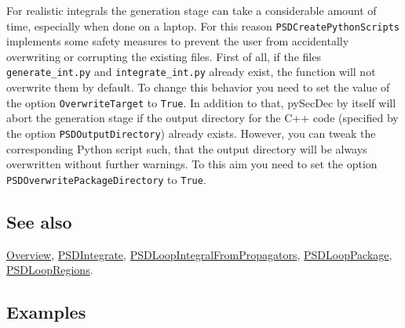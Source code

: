 \documentclass[../FeynHelpersManual.tex]{subfiles}
\begin{document}
For realistic integrals the generation stage can take a considerable
amount of time, especially when done on a laptop. For this reason
\texttt{PSDCreatePythonScripts} implements some safety measures to
prevent the user from accidentally overwriting or corrupting the
existing files. First of all, if the files \texttt{generate_int.py} and
\texttt{integrate_int.py} already exist, the function will not overwrite
them by default. To change this behavior you need to set the value of
the option \texttt{OverwriteTarget} to \texttt{True}. In addition to
that, pySecDec by itself will abort the generation stage if the output
directory for the C++ code (specified by the option
\texttt{PSDOutputDirectory}) already exists. However, you can tweak the
corresponding Python script such, that the output directory will be
always overwritten without further warnings. To this aim you need to set
the option \texttt{PSDOverwritePackageDirectory} to \texttt{True}.

\subsection{See also}

\hyperlink{toc}{Overview}, \hyperlink{psdintegrate}{PSDIntegrate},
\hyperlink{psdloopintegralfrompropagators}{PSDLoopIntegralFromPropagators},
\hyperlink{psdlooppackage}{PSDLoopPackage},
\hyperlink{psdloopregions}{PSDLoopRegions}.

\subsection{Examples}

\begin{Shaded}
\begin{Highlighting}[]
\ExtensionTok{=}\OperatorTok{[}\OperatorTok{,} \OperatorTok{\{}\OperatorTok{[\{}\OperatorTok{,}\OperatorTok{\}],}\OperatorTok{[\{}\SpecialCharTok{+} \OperatorTok{,}\OperatorTok{\}]\},} \OperatorTok{\{}\OperatorTok{\},} \OperatorTok{\{}\OperatorTok{\},} \OperatorTok{\{\},} \OperatorTok{\{\}]}
\ExtensionTok{=}\OperatorTok{[}\OperatorTok{,} \OperatorTok{\{}\OperatorTok{,} \OperatorTok{\}]}
\end{Highlighting}
\end{Shaded}
\end{document}
